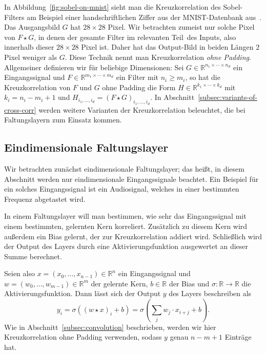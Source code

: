 \documentclass[paper=a4, 	%
		fontsize=11pt,
		abstract=true, 	%
		headsepline, 	%
		notitlepage	%
		]{scrartcl}
\theoremstyle{definition}
\newcommand{\R}{\mathbb{R}}
\begin{document}
In Abbildung~\ref{fig:sobel-on-mnist} sieht man die Kreuzkorrelation des Sobel-Filters am Beispiel einer handschriftlichen Ziffer aus der MNIST-Datenbank aus~\cite{lecun2010mnist}.
Das Ausgangsbild $G$ hat $28\times 28$ Pixel.
Wir betrachten zumeist nur solche Pixel von $F\star G$, in denen der gesamte Filter im \glqq relevanten Teil\grqq\ des Inputs, also innerhalb dieser $28\times 28$ Pixel ist.
Daher hat das Output-Bild in beiden Längen $2$ Pixel weniger als $G$.
Diese Technik nennt man Kreuzkorrelation \emph{ohne Padding}.
Allgemeiner definieren wir für beliebige Dimensionen: Sei $G\in\R^{n_1\times\cdots \times n_d}$ ein Eingangssignal und $F\in\R^{m_1\times\cdots\times m_d}$ ein Filter mit $n_i \geq m_i$, so hat die Kreuzkorrelation von $F$ und $G$ ohne Padding die Form $H\in\R^{k_1\times\cdots\times k_d}$ mit $k_i = n_i - m_i + 1$ und $H_{i_1,\dots,i_d} = (F\star G)_{i_1,\dots,i_d}$. 
In Abschnitt~\ref{subsec:variants-of-cross-corr} werden weitere Varianten der Kreuzkorrelation beleuchtet, die bei Faltungslayern zum Einsatz kommen.




\subsection{Eindimensionale Faltungslayer}

Wir betrachten zunächst eindimensionale Faltungslayer; das heißt, in diesem Abschnitt werden nur eindimensionale Eingangssignale beachtet.
Ein Beispiel für ein solches Eingangssignal ist ein Audiosignal, welches in einer bestimmten Frequenz abgetastet wird.

In einem Faltungslayer will man bestimmen, wie sehr das Eingangssignal mit einem bestimmten, gelernten Kern korreliert.
Zusätzlich zu diesem Kern wird außerdem ein Bias gelernt, der zur Kreuzkorrelation addiert wird.
Schließlich wird der Output des Layers durch eine Aktivierungsfunktion ausgewertet an dieser Summe berechnet.

Seien also $x=(x_0,\dots,x_{n-1})\in\R^n$ ein Eingangssignal und $w=(w_0,\dots,w_{m-1})\in\R^m$ der gelernte Kern, $b\in\R$ der Bias und $\sigma: \R\rightarrow\R$ die Aktivierungsfunktion.
Dann lässt sich der Output $y$ des Layers beschreiben als
\[
    y_i = \sigma\left( (w \star x)_i + b  \right)
    = \sigma\left( \sum_j w_j \cdot x_{i+j} + b \right).
\]
Wie in Abschnitt~\ref{subsec:convolution} beschrieben, werden wir hier Kreuzkorrelation ohne Padding verwenden, sodass $y$ genau ${n-m+1}$ Einträge hat.
\end{document}
